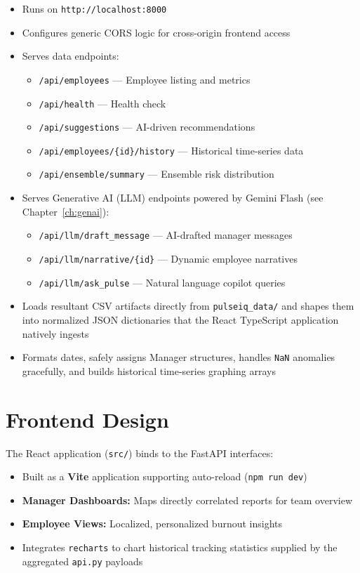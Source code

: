 \documentclass[12pt, a4paper, oneside]{report}
\begin{document}
\begin{itemize}
    \item Runs on \texttt{http://localhost:8000}
    \item Configures generic CORS logic for cross-origin frontend access
    \item Serves data endpoints:
    \begin{itemize}
        \item \texttt{/api/employees} --- Employee listing and metrics
        \item \texttt{/api/health} --- Health check
        \item \texttt{/api/suggestions} --- AI-driven recommendations
        \item \texttt{/api/employees/\{id\}/history} --- Historical time-series data
        \item \texttt{/api/ensemble/summary} --- Ensemble risk distribution
    \end{itemize}
    \item Serves Generative AI (LLM) endpoints powered by Gemini Flash (see Chapter~\ref{ch:genai}):
    \begin{itemize}
        \item \texttt{/api/llm/draft\_message} --- AI-drafted manager messages
        \item \texttt{/api/llm/narrative/\{id\}} --- Dynamic employee narratives
        \item \texttt{/api/llm/ask\_pulse} --- Natural language copilot queries
    \end{itemize}
    \item Loads resultant CSV artifacts directly from \texttt{pulseiq\_data/} and shapes them into normalized JSON dictionaries that the React TypeScript application natively ingests
    \item Formats dates, safely assigns Manager structures, handles \texttt{NaN} anomalies gracefully, and builds historical time-series graphing arrays
\end{itemize}

\section{Frontend Design}
\label{sec:frontend}

The React application (\texttt{src/}) binds to the FastAPI interfaces:

\begin{itemize}
    \item Built as a \textbf{Vite} application supporting auto-reload (\texttt{npm run dev})
    \item \textbf{Manager Dashboards:} Maps directly correlated reports for team overview
    \item \textbf{Employee Views:} Localized, personalized burnout insights
    \item Integrates \texttt{recharts} to chart historical tracking statistics supplied by the aggregated \texttt{api.py} payloads
\end{itemize}
\end{document}
